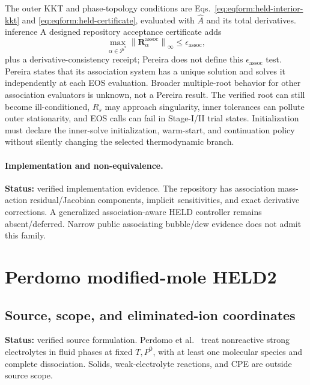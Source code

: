 \documentclass[11pt]{article}
\newcommand{\norm}[1]{\left\lVert #1 \right\rVert}
\newcommand{\Evidence}[1]{\textsf{#1}}
\newcommand{\Status}[1]{\textbf{Status:} \Evidence{#1}.}
\begin{document}
The outer KKT and phase-topology conditions are
Eqs.~\eqref{eq:eqform:held-interior-kkt} and
\eqref{eq:eqform:held-certificate}, evaluated with \(\widehat A\) and its total
derivatives. \Evidence{inference} A designed repository acceptance certificate
adds
\begin{equation}
 \max_{\alpha\in\mathcal P^*}
 \norm{\boldsymbol R^{\mathrm{assoc}}_\alpha}_{\infty}
 \leq\epsilon_{\mathrm{assoc}},
\label{eq:eqform:association-certificate}
\end{equation}
 plus a derivative-consistency receipt; Pereira does not define this
\(\epsilon_{\mathrm{assoc}}\) test. Pereira states that its association system
has a unique solution and solves it independently at each EOS evaluation.
Broader multiple-root behavior for other association evaluators is
\Evidence{unknown}, not a Pereira result. The verified root can still become
ill-conditioned, \(R_s\) may approach singularity, inner tolerances can pollute
outer stationarity, and EOS calls can fail in Stage-I/II trial states.
Initialization must declare the inner-solve initialization, warm-start, and
continuation policy without silently changing the selected thermodynamic
branch.

\paragraph{Implementation and non-equivalence.}
\Status{verified implementation evidence}
The repository has association mass-action residual/Jacobian components,
implicit sensitivities, and exact derivative corrections. A generalized
association-aware HELD controller remains absent/deferred. Narrow public
associating bubble/dew evidence does not admit this family.

\section{Perdomo modified-mole HELD2}
\label{sec:eqform:perdomo-held2}

\subsection{Source, scope, and eliminated-ion coordinates}

\Status{verified source formulation}
Perdomo et al.~\cite{Perdomo2025} treat nonreactive strong electrolytes in
fluid phases at fixed \(T,P^0\), with at least one molecular species and
complete dissociation. Solids, weak-electrolyte reactions, and CPE are outside
source scope.
\end{document}
